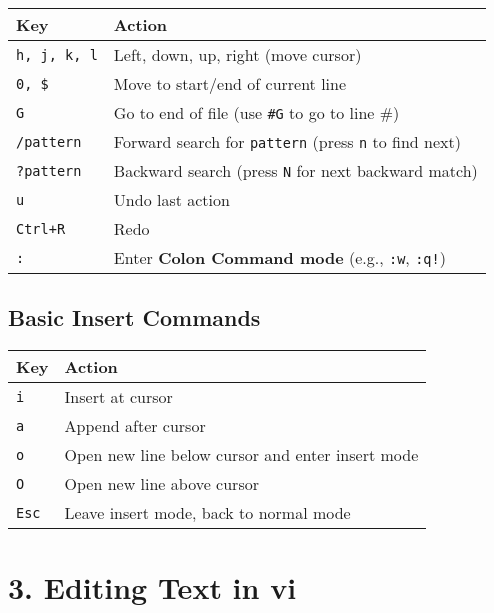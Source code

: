 \documentclass[a4paper]{report}
\begin{document}
\begin{table}[h!]
\begin{tabular}{|l|l|}
\hline
\textbf{Key} & \textbf{Action} \\
\hline
\texttt{h, j, k, l} & Left, down, up, right (move cursor) \\
\texttt{0, \$} & Move to start/end of current line \\
\texttt{G} & Go to end of file (use \texttt{\#G} to go to line \#) \\
\texttt{/pattern} & Forward search for \texttt{pattern} (press \texttt{n} to find next) \\
\texttt{?pattern} & Backward search (press \texttt{N} for next backward match) \\
\texttt{u} & Undo last action \\
\texttt{Ctrl+R} & Redo \\
\texttt{:} & Enter \textbf{Colon Command mode} (e.g., \texttt{:w}, \texttt{:q!}) \\
\hline
\end{tabular}
\end{table}

\subsection*{Basic Insert Commands}
\begin{table}[h!]
\begin{tabular}{|l|l|}
\hline
\textbf{Key} & \textbf{Action} \\
\hline
\texttt{i} & Insert at cursor \\
\texttt{a} & Append after cursor \\
\texttt{o} & Open new line below cursor and enter insert mode \\
\texttt{O} & Open new line above cursor \\
\texttt{Esc} & Leave insert mode, back to normal mode \\
\hline
\end{tabular}
\end{table}

\section*{3. Editing Text in vi}
\end{document}
